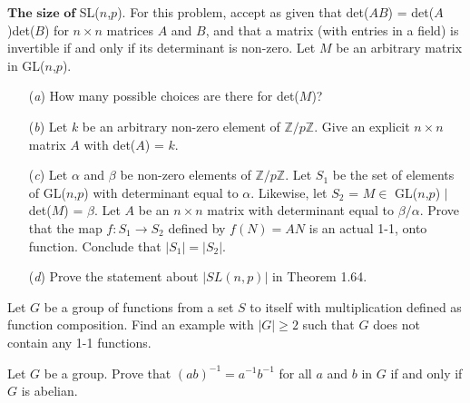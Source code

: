 \documentclass[12pt,letterpaper,boxed]{hmcpset}
\begin{document}

\begin{problem}[1.4.9]
$\textbf{The size of}$ SL($n$,$p$). For this problem, accept as given that det($AB$) = det($A$)det($B$) for $n \times n$ matrices $A$ and $B$, and that a matrix (with entries in a field) is invertible if and only if its determinant is non-zero. Let $M$ be an arbitrary matrix in GL($n$,$p$). 
\begin{itemize}
  \item[(\textit{a})] How many possible choices are there for det($M$)?
  
  \item[(\textit{b})] Let $k$ be an arbitrary non-zero element of $\mathbb{Z}/p\mathbb{Z}$. Give an explicit $n \times n$ matrix $A$ with det($A$) = $k$.
  
  \item[(\textit{c})] Let $\alpha$ and $\beta$ be non-zero elements of $\mathbb{Z}/p\mathbb{Z}$. Let $S_1$ be the set of elements of GL($n$,$p$) with determinant equal to $\alpha$. Likewise, let $S_2$ = {$M \in$ GL($n$,$p$) $\vert$ det($M$) = $\beta$}. Let $A$ be an $n \times n$ matrix with determinant equal to $\beta/\alpha$. Prove that the map $f: S_1 \to S_2$ defined by $f(N) = AN$ is an actual 1-1, onto function. Conclude that $|S_1| = |S_2|$.
  
  \item[(\textit{d})] Prove the statement about $|SL(n,p)|$ in Theorem 1.64. 
\end{itemize}
\end{problem}

\begin{solution}

\end{solution}

\clearpage

\begin{problem}[2.1.8]
Let $ G $ be a group of functions from a set $S$ to itself with multiplication defined as function composition. Find an example with $|G| \geq 2$ such that $G$ does not contain any 1-1 functions. 
\end{problem}

\begin{solution}
\end{solution}

\clearpage

\begin{problem}[2.2.1]
Let $G$ be a group. Prove that $(ab)^{-1} = a^{-1}b^{-1}$ for all $a$ and $b$ in $G$ if and only if $G$ is abelian. 
\end{problem}
\end{document}
